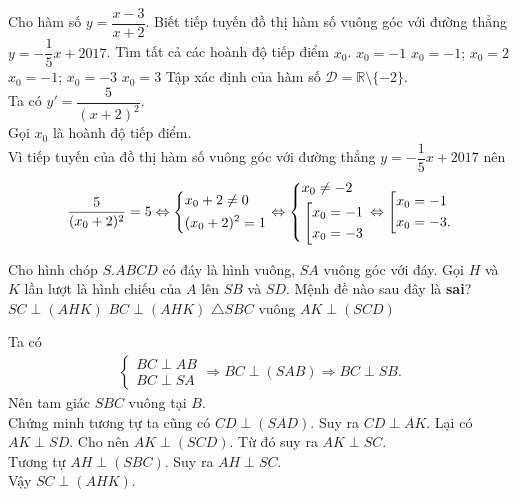 \begin{ex}%
 Cho hàm số $y=\dfrac{x-3}{x+2}$. Biết tiếp tuyến đồ thị hàm số vuông góc với đường thẳng $y=-\dfrac{1}{5}x+2017$. Tìm tất cả các hoành độ tiếp điểm $x_0$.
 \choice
  {$x_0=-1$}
  {$x_0=-1$; $x_0=2$}
  {\True $x_0=-1$; $x_0=-3$}
  {$x_0=3$}
 \loigiai
  {
  Tập xác định của hàm số $\mathscr{D} = \mathbb{R}\setminus\{-2\}$.\\
  Ta có $y' = \dfrac{5}{(x+2)^2}$.\\
  Gọi $x_0$ là hoành độ tiếp điểm.\\
  Vì tiếp tuyến của đồ thị hàm số vuông góc với đường thẳng $y=-\dfrac{1}{5}x+2017$ nên
  \begin{align*}
   \dfrac{5}{(x_0+2)^2} = 5 \Leftrightarrow\left\{\begin{aligned}& x_0+2 \neq 0 \\& (x_0+2)^2 = 1\end{aligned}\right. \Leftrightarrow \left\{\begin{aligned}& x_0 \neq -2 \\& \left[\begin{aligned}& x_0=-1 \\& x_0=-3\end{aligned}\right.\end{aligned}\right. \Leftrightarrow \left[\begin{aligned}& x_0 = -1 \\& x_0 = -3.\end{aligned}\right.
  \end{align*}
  }
\end{ex}


\begin{ex}%
 Cho hình chóp $S.ABCD$ có đáy là hình vuông, $SA$ vuông góc với đáy. Gọi $H$ và $K$ lần lượt là hình chiếu của $A$ lên $SB$ và $SD$. Mệnh đề nào sau đây là \textbf{sai}?
 \choice
  {$SC \perp (AHK)$}
  {\True $BC \perp (AHK)$}
  {$\triangle SBC$ vuông}
  {$AK \perp (SCD)$}
 \loigiai
  {
  \immini
  {
  Ta có
  \begin{align*}
   \begin{cases} BC \perp AB \\ BC \perp SA \end{cases} \Rightarrow BC \perp (SAB) \Rightarrow BC \perp SB.
  \end{align*}
  Nên tam giác $SBC$ vuông tại $B$.\\
  Chứng minh tương tự ta cũng có $CD \perp (SAD)$. Suy ra $CD \perp AK$. Lại có $AK \perp SD$. Cho nên $AK \perp (SCD)$. Từ đó suy ra $AK \perp SC$.\\
  Tương tự $AH \perp (SBC)$. Suy ra $AH \perp SC$.\\
  Vậy $SC \perp (AHK)$.
  }
  {
  }
  }
\end{ex}


